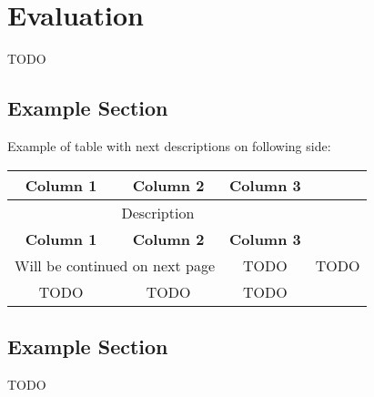 \chapter{Evaluation}
\label{sec:evaluation}
TODO

\section{Example Section}
Example of table with next descriptions on following side:
\begin{longtable}{|c|c|c|c|}
	\hline
	\multicolumn{1}{|c}{\textbf{Column 1}} &
	\multicolumn{1}{|c}{\textbf{Column 2}} &
	\multicolumn{1}{|c|}{\textbf{Column 3}} \\
	\hline
	\endfirsthead
	
	\multicolumn{3}{c}{Description}\\ \hline
	\multicolumn{1}{|c}{\textbf{Column 1}} &
	\multicolumn{1}{|c}{\textbf{Column 2}} &
	\multicolumn{1}{|c|}{\textbf{Column 3}} \\
	\hline
	\endhead
	
	\multicolumn{2}{c}{Will be continued on next page}
	\endfoot
	
	\caption{Description}
	\label{tab:example}
	\endlastfoot
	
	TODO & TODO & TODO \\ \hline
	TODO & TODO & TODO  \\ \hline
\end{longtable}

\section{Example Section}
TODO